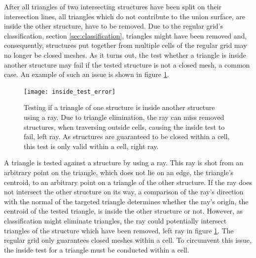 After all triangles of two intersecting structures have been split on their intersection lines, all triangles which do not contribute to the union surface, \ie are inside the other structure, have to be removed.
Due to the regular grid's classification, \cf section \ref{sec:classification}, triangles might have been removed and, consequently, structures put together from multiple cells of the regular grid may no longer be closed meshes.
As it turns out, the test whether a triangle is inside another structure may fail if the tested structure is not a closed mesh, a common case.
An example of such an issue is shown in figure \ref{fig:inside_test_error}.
%
\begin{figure}[!]
	\centering
	\texttt{[image: inside\_test\_error]}
	\caption{
		Testing if a triangle of one structure is inside another structure using a ray.
		Due to triangle elimination, the ray can miss removed structures, \eg when traversing outside cells, causing the inside test to fail, \cf left ray.
		As structures are guaranteed to be closed within a cell, this test is only valid within a cell, \cf right ray.
	}
	\label{fig:inside_test_error}
\end{figure}
%
A triangle is tested against a structure by using a ray.
This ray is shot from an arbitrary point on the triangle, which does not lie on an edge, \eg the triangle's centroid, to an arbitrary point on a triangle of the other structure.
If the ray does not intersect the other structure on its way, a comparison of the ray's direction with the normal of the targeted triangle determines whether the ray's origin, \ie the centroid of the tested triangle, is inside the other structure or not.
However, as classification might eliminate triangles, the ray could potentially intersect triangles of the structure which have been removed, \cf left ray in figure \ref{fig:inside_test_error}.
The regular grid only guarantees closed meshes within a cell.
To circumvent this issue, the inside test for a triangle must be conducted within a cell.

